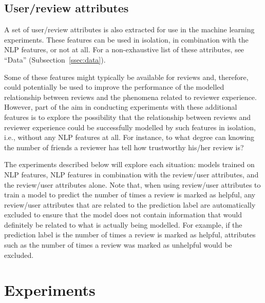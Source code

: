 \documentclass[9pt]{article}
\begin{document}
\subsection{User/review attributes}
\label{ssec:attributes}

A set of user/review attributes is also extracted for use in the machine learning experiments. These features can be used in isolation, in combination with the NLP features, or not at all. For a non-exhaustive list of these attributes, see ``Data'' (Subsection~\ref{ssec:data}).

Some of these features might typically be available for reviews and, therefore, could potentially be used to improve the performance of the modelled relationship between reviews and the phenomena related to reviewer experience. However, part of the aim in conducting experiments with these additional features is to explore the possibility that the relationship between reviews and reviewer experience could be successfully modelled by such features in isolation, i.e., without any NLP features at all. For instance, to what degree can knowing the number of friends a reviewer has tell how trustworthy his/her review is?

The experiments described below will explore each situation: models trained on NLP features, NLP features in combination with the review/user attributes, and the review/user attributes alone. Note that, when using review/user attributes to train a model to predict the number of times a review is marked as helpful, any review/user attributes that are related to the prediction label are automatically excluded to ensure that the model does not contain information that would definitely be related to what is actually being modelled. For example, if the prediction label is the number of times a review is marked as helpful, attributes such as the number of times a review was marked as unhelpful would be excluded.

\section{Experiments}
\label{sec:experiments}
\end{document}
